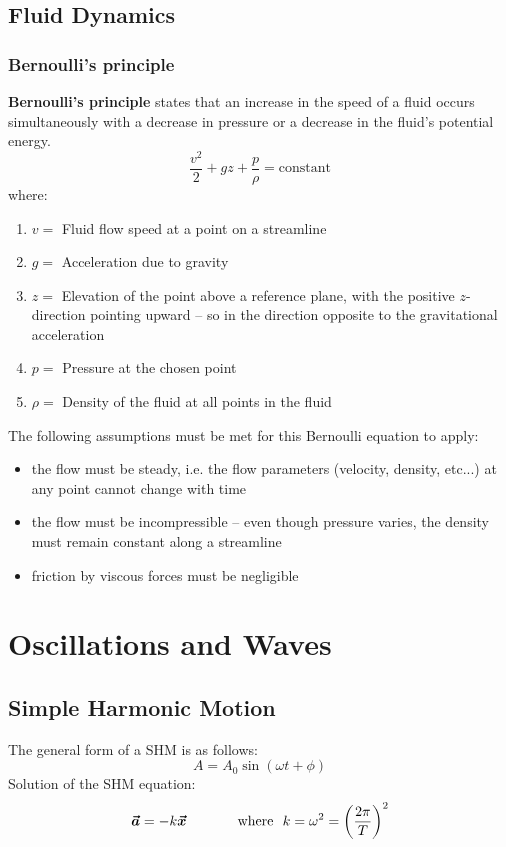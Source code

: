 \documentclass[11pt]{article}
\numberwithin{equation}{section}
\newcommand{\bvec}[1]{\boldsymbol{\vec{#1}}}
\begin{document}
		\subsection{Fluid Dynamics}
			\subsubsection{Bernoulli’s principle}
				\textbf{Bernoulli's principle} states that an increase in the speed of a fluid occurs simultaneously with a decrease in pressure or a decrease in the fluid's potential energy. 
				\begin{equation*}
					\frac{v^{2}}{2}+gz+\frac{p}{\rho}=\text{constant}
				\end{equation*}
				where:
				\begin{enumerate}[label={}]
					\item $v =$ Fluid flow speed at a point on a streamline
					\item $g =$ Acceleration due to gravity
					\item $z =$ Elevation of the point above a reference plane, with the positive $z$-direction pointing upward – so in the direction opposite to the gravitational acceleration
					\item $p = $ Pressure at the chosen point
					\item $\rho = $ Density of the fluid at all points in the fluid
				\end{enumerate}
				The following assumptions must be met for this Bernoulli equation to apply:
				\begin{itemize}
					\item the flow must be steady, i.e. the flow parameters (velocity, density, etc...) at any point cannot change with time
					\item the flow must be incompressible – even though pressure varies, the density must remain constant along a streamline
					\item friction by viscous forces must be negligible
				\end{itemize}
	\pagebreak
	\section{Oscillations and Waves}
		\subsection{Simple Harmonic Motion}
		The general form of a SHM is as follows:
		\begin{equation*}
			A=A_0\sin(\omega t+\phi)
		\end{equation*}
		Solution of the SHM equation:
		\begin{equation*}
			\bvec{a}=-k\bvec{x} ~~~~~~~~~ \text{~~where~~} k=\omega^2=\left(\frac{2\pi}{T}\right)^2
			\vspace{-1em}
		\end{equation*}
		
\end{document}
